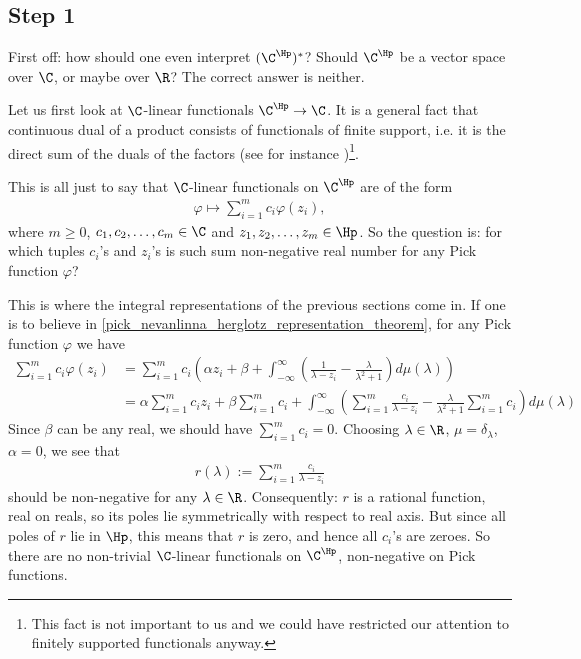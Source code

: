 \subsection{Step 1}\label{step_1}

First off: how should one even interpret $(\C^{\Hp})^{*}$? Should $\C^{\Hp}$ be a vector space over $\C$, or maybe over $\R$? The correct answer is neither.

Let us first look at $\C$-linear functionals $\C^{\Hp} \to \C$. It is a general fact that continuous dual of a product consists of functionals of finite support, i.e. it is the direct sum of the duals of the factors (see for instance \cite{Osb})\footnote{This fact is not important to us and we could have restricted our attention to finitely supported functionals anyway.}.

This is all just to say that $\C$-linear functionals on $\C^{\Hp}$ are of the form
\begin{align*}
	\varphi \mapsto \sum_{i = 1}^{m} c_{i} \varphi(z_{i}),
\end{align*}
where $m \geq 0$, $c_{1}, c_{2}, \ldots, c_{m} \in \C$ and $z_{1}, z_{2}, \ldots, z_{m} \in \Hp$. So the question is: for which tuples $c_{i}$'s and $z_{i}$'s is such sum non-negative real number for any Pick function $\varphi$?

This is where the integral representations of the previous sections come in. If one is to believe in \ref{pick_nevanlinna_herglotz_representation_theorem}, for any Pick function $\varphi$ we have
\begin{align*}
	\sum_{i = 1}^{m} c_{i} \varphi(z_{i}) &= \sum_{i = 1}^{m} c_{i} \left(\alpha z_{i} + \beta + \int_{-\infty}^{\infty} \left(\frac{1}{\lambda - z_{i}} - \frac{\lambda}{\lambda^2 + 1}\right) d \mu(\lambda)\right) \\
	&= \alpha \sum_{i = 1}^{m} c_{i} z_{i} + \beta \sum_{i = 1}^{m} c_{i} + \int_{-\infty}^{\infty} \left( \sum_{i = 1}^{m}\frac{c_{i}}{\lambda - z_{i}} - \frac{\lambda}{\lambda^2 + 1} \sum_{i = 1}^{m} c_{i} \right) d \mu(\lambda)
\end{align*}
Since $\beta$ can be any real, we should have $\sum_{i = 1}^{m} c_{i} = 0$. Choosing $\lambda \in \R$, $\mu = \delta_{\lambda}$, $\alpha = 0$, we see that
\begin{align*}
	r(\lambda) := \sum_{i = 1}^{m}\frac{c_{i}}{\lambda - z_{i}}
\end{align*}
should be non-negative for any $\lambda \in \R$. Consequently: $r$ is a rational function, real on reals, so its poles lie symmetrically with respect to real axis. But since all poles of $r$ lie in $\Hp$, this means that $r$ is zero, and hence all $c_{i}$'s are zeroes. So there are no non-trivial $\C$-linear functionals on $\C^{\Hp}$, non-negative on Pick functions.


